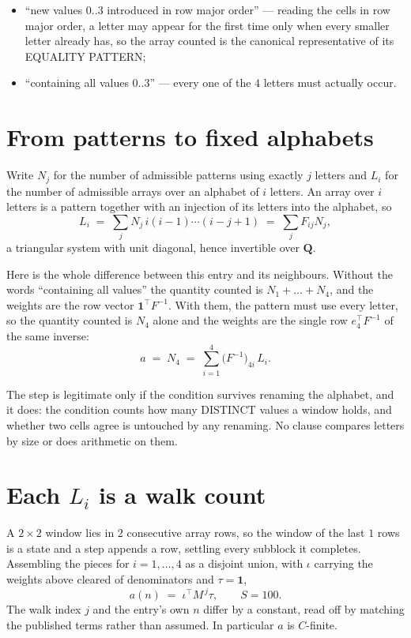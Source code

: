 \documentclass[11pt,a4paper]{article}
\theoremstyle{plain}
\theoremstyle{definition}
\begin{document}
\begin{itemize}
\item ``new values $0..3$ introduced in row major order'' --- reading the cells in row major
order, a letter may appear for the first time only when every smaller letter already has, so
the array counted is the canonical representative of its EQUALITY PATTERN;
\item ``containing all values $0..3$'' --- every one of the $4$ letters must actually
occur.
\end{itemize}


\section{From patterns to fixed alphabets}

Write $N_j$ for the number of admissible patterns using exactly $j$ letters and $L_i$ for the
number of admissible arrays over an alphabet of $i$ letters. An array over $i$ letters is a
pattern together with an injection of its letters into the alphabet, so
\[
L_i\;=\;\sum_{j} N_j\,i(i-1)\cdots(i-j+1)\;=\;\sum_j F_{ij}N_j ,
\]
a triangular system with unit diagonal, hence invertible over $\mathbf{Q}$.

Here is the whole difference between this entry and its neighbours. Without the words
``containing all values'' the quantity counted is $N_1+\dots+N_{4}$, and the weights are
the row vector $\mathbf{1}^{\!\top}F^{-1}$. With them, the pattern must use every letter,
so the quantity counted is $N_{4}$ alone and the weights are the single row
$e_{4}^{\!\top}F^{-1}$ of the same inverse:
\[
a\;=\;N_{4}\;=\;\sum_{i=1}^{4}\bigl(F^{-1}\bigr)_{4i}\,L_i .
\]

The step is legitimate only if the condition survives renaming the alphabet, and it does: the
condition counts how many DISTINCT values a window holds, and whether two cells agree is
untouched by any renaming. No clause compares letters by size or does arithmetic on them.

\section{Each $L_i$ is a walk count}

A $2\times2$ window lies in $2$ consecutive array rows, so the window of the last
$1$ rows is a state and a step appends a row, settling every subblock it completes.
Assembling the pieces for $i=1,\dots,4$ as a disjoint union, with $\iota$ carrying the
weights above cleared of denominators and $\tau=\mathbf{1}$,
\[
a(n)\;=\;\iota^{\!\top}M^{\,j}\tau ,\qquad S=100.
\]
The walk index $j$ and the entry's own $n$ differ by a constant, read off by matching the
published terms rather than assumed. In particular $a$ is $C$-finite.
\end{document}
